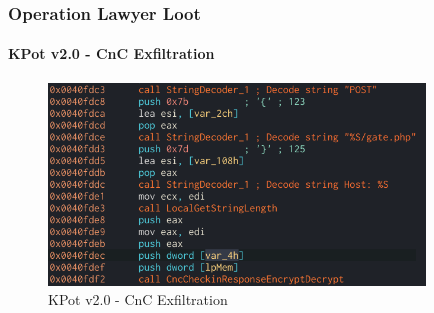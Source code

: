 \documentclass[aspectratio=169]{beamer}
\begin{document}
{
\begin{frame}
  \frametitle{Operation Lawyer Loot}
  \framesubtitle{KPot v2.0 - CnC Exfiltration}
    \begin{figure}
    \includegraphics[width=10cm]{kpot-cnc-exfiltration}
    \caption{KPot v2.0 - CnC Exfiltration}
  \end{figure}
\end{frame}
}
\end{document}

